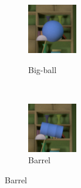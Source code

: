 \documentclass{jov}
\begin{document}
\begin{figure}
\centering
    \begin{subfigure}[b]{0.14 \textwidth}
        \caption{Big-ball}
        \includegraphics[width=\textwidth]{../FiguresDraft4/Figure4/Figure4_a.png}
        \label{fig:libraryWithBigBall}
    \end{subfigure}
     ~ 
    \begin{subfigure}[b]{0.14 \textwidth}
        \caption{Barrel}
        \includegraphics[width=\textwidth]{../FiguresDraft4/Figure4/Figure4_c.png}

\end{subfigure}
\end{figure}
\end{document}
